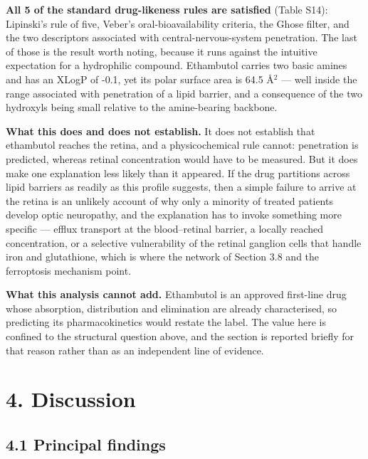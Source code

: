 \documentclass[utf8]{FrontiersinVancouver}
\begin{document}
\textbf{All 5 of the standard drug-likeness rules are satisfied} (Table S14): Lipinski's rule of five, Veber's oral-bioavailability criteria, the Ghose filter, and the two descriptors associated with central-nervous-system penetration. The last of those is the result worth noting, because it runs against the intuitive expectation for a hydrophilic compound. Ethambutol carries two basic amines and has an XLogP of -0.1, yet its polar surface area is 64.5 \AA{}$^{2}$ --- well inside the range associated with penetration of a lipid barrier, and a consequence of the two hydroxyls being small relative to the amine-bearing backbone.

\textbf{What this does and does not establish.} It does not establish that ethambutol reaches the retina, and a physicochemical rule cannot: penetration is predicted, whereas retinal concentration would have to be measured. But it does make one explanation less likely than it appeared. If the drug partitions across lipid barriers as readily as this profile suggests, then a simple failure to arrive at the retina is an unlikely account of why only a minority of treated patients develop optic neuropathy, and the explanation has to invoke something more specific --- efflux transport at the blood--retinal barrier, a locally reached concentration, or a selective vulnerability of the retinal ganglion cells that handle iron and glutathione, which is where the network of Section 3.8 and the ferroptosis mechanism point.

\textbf{What this analysis cannot add.} Ethambutol is an approved first-line drug whose absorption, distribution and elimination are already characterised, so predicting its pharmacokinetics would restate the label. The value here is confined to the structural question above, and the section is reported briefly for that reason rather than as an independent line of evidence.

\section{4. Discussion}

\subsection{4.1 Principal findings}
\end{document}
